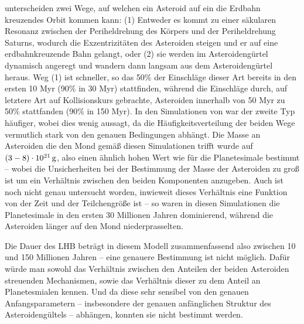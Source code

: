 \documentclass[12pt,a4paper,twoside]{article}
\renewcommand{\cite}{\citep}
\begin{document}
\cite{Gomes2005} unterscheiden zwei Wege, auf welchen ein Asteroid auf ein die Erdbahn kreuzendes Orbit kommen kann: (1) Entweder es kommt zu einer säkularen Resonanz zwischen der Periheldrehung des Körpers und der Periheldrehung Saturns, wodurch die Exzentrizitäten des Asteroiden steigen und er auf eine erdbahnkreuzende Bahn gelangt, oder (2) sie werden im Asteroidengürtel dynamisch angeregt und wandern dann langsam aus dem Asteroidengürtel heraus. %
Weg (1) ist schneller, so das 50\% der Einschläge dieser Art bereits in den ersten 10 Myr (90\% in 30 Myr) stattfinden, während die Einschläge durch, auf letztere Art auf Kollisionskurs gebrachte, Asteroiden innerhalb von 50 Myr zu 50\% stattfanden (90\% in 150 Myr)\cite{Gomes2005}.
In den Simulationen von \cite{Gomes2005} war der zweite Typ häufiger, wobei dies wenig aussagt, da
die Häufigkeitsverteilung der beiden Wege vermutlich stark von den genauen Bedingungen abhängt. %
Die Masse an Asteroiden die den Mond gemäß diesen Simulationen trifft wurde auf $\unit[\left( 3-8 \right) \cdot 10^{21}]{g}$, %
also einen ähnlich hohen Wert wie für die Planetesimale bestimmt – wobei die Unsicherheiten bei der Bestimmung der Masse der Asteroiden zu groß ist um ein Verhältnis zwischen den beiden Komponenten anzugeben. Auch ist noch nicht genau untersucht worden, inwieweit dieses Verhältnis eine Funktion von der Zeit und der Teilchengröße ist – so waren in diesen Simulationen die Planetesimale in den ersten 30 Millionen Jahren dominierend, während die Asteroiden länger auf den Mond niederprasselten\cite{Gomes2005}.

Die Dauer des LHB beträgt in diesem Modell zusammenfassend also zwischen 10 und 150 Millionen Jahren – eine genauere Bestimmung ist nicht möglich. Dafür würde man sowohl das Verhältnis zwischen den Anteilen der beiden Asteroiden streuenden Mechanismen, sowie das Verhältnis dieser zu dem Anteil an Planetesmialen kennen. Und da diese sehr sensibel von den genauen Anfangsparametern – insbesondere der genauen anfänglichen Struktur des Asteroidengültels – abhängen, konnten sie nicht bestimmt werden\cite{Gomes2005}.
\end{document}
